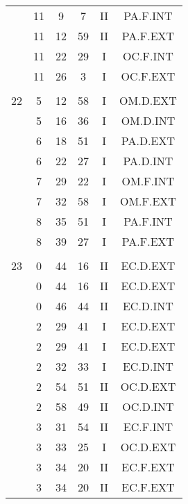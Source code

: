 \documentclass[12pt, a4paper]{article}
\begin{document}
\begin{multicols}{3}
{\begin{tabular}{c c c c c c}
	 	 	 	 & 11 & 9 & 7 & II & PA.F.INT\\%
	 	 	 	 & 11 & 12 & 59 & II & PA.F.EXT\\%
	 	 	 	 & 11 & 22 & 29 & I & OC.F.INT\\%
	 	 	 	 & 11 & 26 & 3 & I & OC.F.EXT\\%
	 	 	 	 & & & & & \\%
	 	 	 	22 & 5 & 12 & 58 & I & OM.D.EXT\\%
	 	 	 	 & 5 & 16 & 36 & I & OM.D.INT\\%
	 	 	 	 & 6 & 18 & 51 & I & PA.D.EXT\\%
	 	 	 	 & 6 & 22 & 27 & I & PA.D.INT\\%
	 	 	 	 & 7 & 29 & 22 & I & OM.F.INT\\%
	 	 	 	 & 7 & 32 & 58 & I & OM.F.EXT\\%
	 	 	 	 & 8 & 35 & 51 & I & PA.F.INT\\%
	 	 	 	 & 8 & 39 & 27 & I & PA.F.EXT\\%
	 	 	 	 & & & & & \\%
	 	 	 	23 & 0 & 44 & 16 & II & EC.D.EXT\\%
	 	 	 	 & 0 & 44 & 16 & II & EC.D.EXT\\%
	 	 	 	 & 0 & 46 & 44 & II & EC.D.INT\\%
	 	 	 	 & 2 & 29 & 41 & I & EC.D.EXT\\%
	 	 	 	 & 2 & 29 & 41 & I & EC.D.EXT\\%
	 	 	 	 & 2 & 32 & 33 & I & EC.D.INT\\%
	 	 	 	 & 2 & 54 & 51 & II & OC.D.EXT\\%
	 	 	 	 & 2 & 58 & 49 & II & OC.D.INT\\%
	 	 	 	 & 3 & 31 & 54 & II & EC.F.INT\\%
	 	 	 	 & 3 & 33 & 25 & I & OC.D.EXT\\%
	 	 	 	 & 3 & 34 & 20 & II & EC.F.EXT\\%
	 	 	 	 & 3 & 34 & 20 & II & EC.F.EXT\\%
	 	 \end{tabular}
 	}
\end{multicols}
\end{document}
